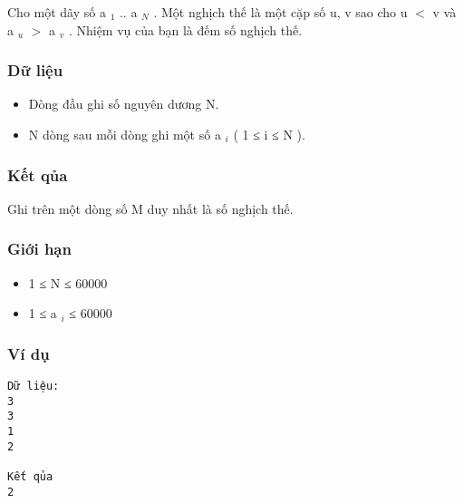 



   Cho một dãy số a   $_    1   $   .. a   $_    N   $   . Một nghịch thế là một cặp số u, v sao cho u $<$ v và a   $_    u   $   $>$ a   $_    v   $   . Nhiệm vụ của bạn là đếm số nghịch thế.  

\subsubsection{   Dữ liệu  }
\begin{itemize}
	\item     Dòng đầu ghi số nguyên dương N.   
	\item     N dòng sau mỗi dòng ghi một số a    $_     i    $    ( 1 ≤ i ≤ N ).   
\end{itemize}

\subsubsection{   Kết qủa  }

   Ghi trên một dòng số M duy nhất là số nghịch thế.  

\subsubsection{   Giới hạn  }
\begin{itemize}
	\item     1 ≤ N ≤ 60000   
	\item     1 ≤ a    $_     i    $    ≤ 60000   
\end{itemize}

\subsubsection{   Ví dụ  }
\begin{verbatim}
Dữ liệu:
3
3
1
2

Kết qủa
2
\end{verbatim}